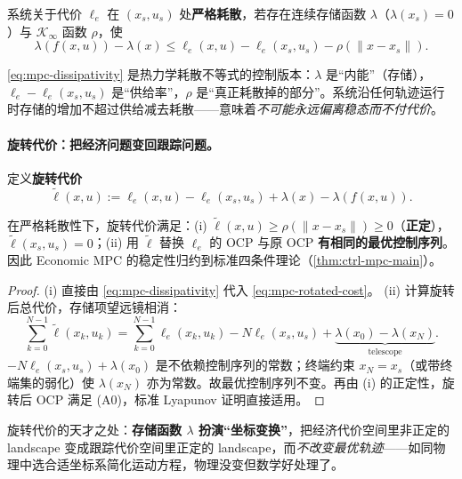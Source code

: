 \begin{definition}
\label{def:mpc-dissipativity}
系统关于代价 $\ell_e$ 在 $(x_s,u_s)$ 处\textbf{严格耗散}，若存在连续存储函数 $\lambda$（$\lambda(x_s)=0$）与 $\mathcal K_\infty$ 函数 $\rho$，使
\begin{equation}
  \lambda(f(x,u))-\lambda(x)\le\ell_e(x,u)-\ell_e(x_s,u_s)-\rho(\|x-x_s\|).
  \label{eq:mpc-dissipativity}
\end{equation}
\end{definition}

\begin{insight}
\cref{eq:mpc-dissipativity} 是热力学耗散不等式的控制版本：$\lambda$ 是“内能”（存储），$\ell_e-\ell_e(x_s,u_s)$ 是“供给率”，$\rho$ 是“真正耗散掉的部分”。系统沿任何轨迹运行时存储的增加不超过供给减去耗散——意味着\emph{不可能永远偏离稳态而不付代价}。
\end{insight}

\paragraph{旋转代价：把经济问题变回跟踪问题。}
定义\textbf{旋转代价}\cite{diehl2011lyapunov}
\begin{equation}
  \tilde\ell(x,u):=\ell_e(x,u)-\ell_e(x_s,u_s)+\lambda(x)-\lambda(f(x,u)).
  \label{eq:mpc-rotated-cost}
\end{equation}

\begin{theorem}[旋转代价的等价与正定性]
\label{thm:mpc-rotated}
在严格耗散性下，旋转代价满足：(i) $\tilde\ell(x,u)\ge\rho(\|x-x_s\|)\ge0$（\textbf{正定}），$\tilde\ell(x_s,u_s)=0$；(ii) 用 $\tilde\ell$ 替换 $\ell_e$ 的 OCP 与原 OCP \textbf{有相同的最优控制序列}。因此 Economic MPC 的稳定性归约到标准四条件理论（\cref{thm:ctrl-mpc-main}）。
\end{theorem}

\begin{proof}
(i) 直接由 \cref{eq:mpc-dissipativity} 代入 \cref{eq:mpc-rotated-cost}。
(ii) 计算旋转后总代价，存储项望远镜相消：
\[
  \sum_{k=0}^{N-1}\tilde\ell(x_k,u_k)=\sum_{k=0}^{N-1}\ell_e(x_k,u_k)-N\ell_e(x_s,u_s)+\underbrace{\lambda(x_0)-\lambda(x_N)}_{\text{telescope}}.
\]
$-N\ell_e(x_s,u_s)+\lambda(x_0)$ 是不依赖控制序列的常数；终端约束 $x_N=x_s$（或带终端集的弱化）使 $\lambda(x_N)$ 亦为常数。故最优控制序列不变。再由 (i) 的正定性，旋转后 OCP 满足 (A0)，标准 Lyapunov 证明直接适用。
\end{proof}

\begin{insight}
旋转代价的天才之处：\textbf{存储函数 $\lambda$ 扮演“坐标变换”}，把经济代价空间里非正定的 landscape 变成跟踪代价空间里正定的 landscape，而\emph{不改变最优轨迹}——如同物理中选合适坐标系简化运动方程，物理没变但数学好处理了。
\end{insight}

